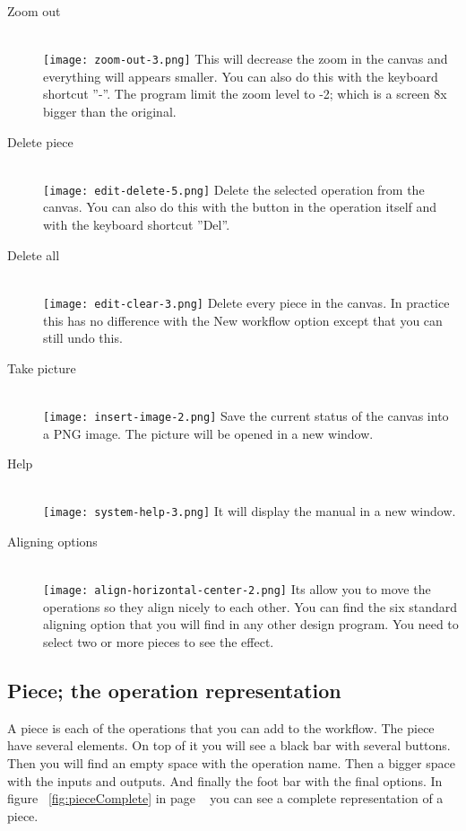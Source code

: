 \documentclass[a4paper,10pt]{article}
\begin{document}
\begin{description}
      \item[Zoom out] \hfill \\
      \texttt{[image: zoom-out-3.png]} This will decrease the zoom in the canvas and everything will appears smaller. You can also do this with the keyboard shortcut ''-''. The program limit the zoom level to -2; which is a screen 8x bigger than the original.

      \item[Delete piece] \hfill \\
      \texttt{[image: edit-delete-5.png]} Delete the selected operation from the canvas. You can also do this with the button in the operation itself and with the keyboard shortcut ''Del''.

      \item[Delete all] \hfill \\
      \texttt{[image: edit-clear-3.png]} Delete every piece in the canvas. In practice this has no difference with the New workflow option except that you can still undo this.

      \item[Take picture] \hfill \\
      \texttt{[image: insert-image-2.png]} Save the current status of the canvas into a PNG image. The picture will be opened in a new window.

      \item[Help] \hfill \\
      \texttt{[image: system-help-3.png]} It will display the manual in a new window.

      \item[Aligning options] \hfill \\
      \texttt{[image: align-horizontal-center-2.png]} Its allow you to move the operations so they align nicely to each other. You can find the six standard aligning option that you will find in any other design program. You need to select two or more pieces to see the effect.

    \end{description}

  \subsection{Piece; the operation representation}

   A piece is each of the operations that you can add to the workflow. The piece have several elements. On top of it you will see a black bar with several buttons. Then you will find an empty space with the operation name. Then a bigger space with the inputs and outputs. And finally the foot bar with the final options. In figure ~\ref{fig:pieceComplete} in page ~\pageref{fig:pieceComplete} you can see a complete representation of a piece.
\end{document}
